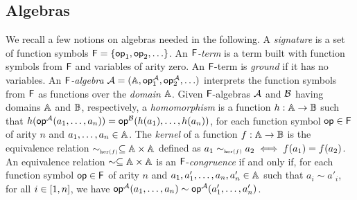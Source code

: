 \subsection{Algebras}
\label{subsec:algebras}

We recall a few notions on algebras needed in the following. A
\emph{signature} is a set of function symbols $\mathsf{F}={\{ {\mathsf{op}_1,
  \mathsf{op}_2, \ldots} \}}$.  An \emph{$\mathsf{F}$-term} is a term built with
function symbols from $\mathsf{F}$ and variables of arity zero.  An
$\mathsf{F}$-term is \emph{ground} if it has no variables.  An
\emph{$\mathsf{F}$-algebra} $\mathcal{A} =
(\mathbb{A},\mathsf{op}^{\mathcal{A}}_1,\mathsf{op}^{\mathcal{A}}_2,\ldots)$ interprets
the function symbols from $\mathsf{F}$ as functions over the
\emph{domain} $\mathbb{A}$.  Given $\mathsf{F}$-algebras
$\mathcal{A}$ and $\mathcal{B}$ having domains $\mathbb{A}$ and
$\mathbb{B}$, respectively, a \emph{homomorphism} is a function $h
: \mathbb{A} \rightarrow \mathbb{B}$ such that
$h(\mathsf{op}^{\mathcal{A}}(a_1, \ldots, a_n)) = \mathsf{op}^{\mathcal{B}}(h(a_1),
\ldots, h(a_n))$, for each function symbol $\mathsf{op}\in\mathsf{F}$ of
arity $n$ and $a_1, \ldots, a_n \in \mathbb{A}$. The \emph{kernel}
of a function $f : \mathbb{A} \rightarrow \mathbb{B}$ is the
equivalence relation $\sim_{\scriptscriptstyle{\mathrm{ker}(f)}} \subseteq \mathbb{A} \times
\mathbb{A}$ defined as $a_1 \sim_{\scriptscriptstyle{\mathrm{ker}(f)}} a_2 \iff f(a_1)=f(a_2)$. An
equivalence relation $\sim \subseteq \mathbb{A} \times
\mathbb{A}$ is an $\mathsf{F}$-\emph{congruence} if and only if,
for each function symbol $\mathsf{op}\in\mathsf{F}$ of arity $n$ and $a_1,
a'_1, \ldots, a_n, a'_n \in \mathbb{A}$ such that $a_i\sim a'_i$,
for all $i \in {[{1},{n}]}$, we have $\mathsf{op}^{\mathcal{A}}(a_1,\ldots,a_n)
\sim \mathsf{op}^{\mathcal{A}}(a'_1,\ldots,a'_n)$.

